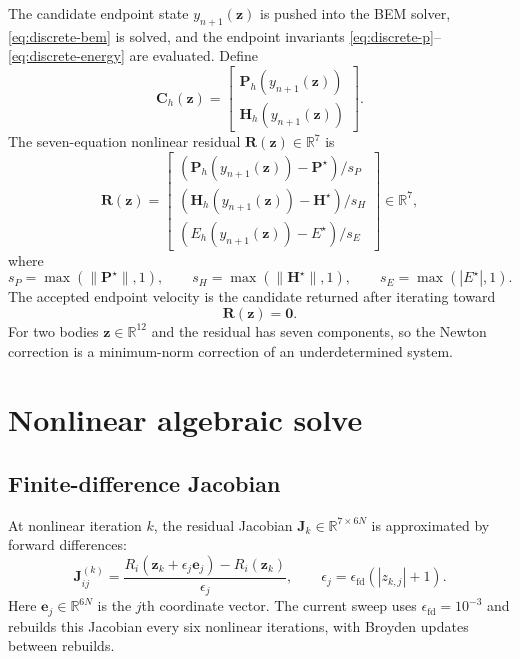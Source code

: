 \documentclass[11pt,a4paper]{article}
\newcommand{\R}{\mathbb{R}}
\newcommand{\bP}{\bm{P}}
\newcommand{\bH}{\bm{H}}
\newcommand{\bC}{\bm{C}}
\newcommand{\bR}{\bm{R}}
\newcommand{\bz}{\bm{z}}
\newcommand{\bJ}{\bm{J}}
\newcommand{\be}{\bm{e}}
\newcommand{\bzero}{\bm{0}}
\begin{document}
The candidate endpoint state $y_{n+1}(\bz)$ is pushed into the BEM solver,
\eqref{eq:discrete-bem} is solved, and the endpoint invariants
\eqref{eq:discrete-p}--\eqref{eq:discrete-energy} are evaluated.  Define
\begin{equation}
  \bC_h(\bz)
  =
  \begin{bmatrix}
    \bP_h(y_{n+1}(\bz))\\
    \bH_h(y_{n+1}(\bz))
  \end{bmatrix}.
  \label{eq:c-of-z}
\end{equation}
The seven-equation nonlinear residual $\bR(\bz)\in\R^7$ is
\begin{equation}
  \bR(\bz)
  =
  \begin{bmatrix}
    \left(\bP_h(y_{n+1}(\bz))-\bP^\star\right)/s_P\\
    \left(\bH_h(y_{n+1}(\bz))-\bH^\star\right)/s_H\\
    \left(E_h(y_{n+1}(\bz))-E^\star\right)/s_E
  \end{bmatrix}
  \in\R^7,
  \label{eq:residual}
\end{equation}
where
\begin{equation}
  s_P=\max(\|\bP^\star\|,1),\qquad
  s_H=\max(\|\bH^\star\|,1),\qquad
  s_E=\max(|E^\star|,1).
  \label{eq:residual-scales}
\end{equation}
The accepted endpoint velocity is the candidate returned after iterating toward
\begin{equation}
  \bR(\bz)=\bzero.
  \label{eq:nonlinear-system}
\end{equation}
For two bodies $\bz\in\R^{12}$ and the residual has seven components, so the
Newton correction is a minimum-norm correction of an underdetermined system.

\section{Nonlinear algebraic solve}

\subsection{Finite-difference Jacobian}

At nonlinear iteration $k$, the residual Jacobian
$\bJ_k\in\R^{7\times 6N}$ is approximated by forward differences:
\begin{equation}
  \bJ_{ij}^{(k)}
  =
  \frac{
    R_i(\bz_k+\epsilon_j\be_j)-R_i(\bz_k)
  }{\epsilon_j},
  \qquad
  \epsilon_j
  =
  \epsilon_{\mathrm{fd}}\left(|z_{k,j}|+1\right).
  \label{eq:fd-jacobian}
\end{equation}
Here $\be_j\in\R^{6N}$ is the $j$th coordinate vector.  The current sweep uses
$\epsilon_{\mathrm{fd}}=10^{-3}$ and rebuilds this Jacobian every six nonlinear
iterations, with Broyden updates between rebuilds.
\end{document}
